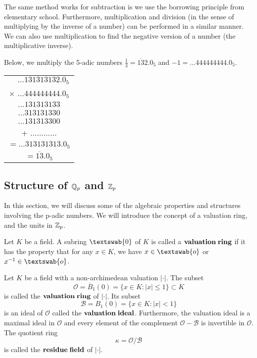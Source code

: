 \documentclass[a4paper]{article}
\begin{document}
The same method works for subtraction is we use the borrowing principle 
from elementary school.  Furthermore, multiplication and division (in
the sense of multiplying by the inverse of a number) can be performed 
in a similar manner.  We can also use multiplication to find the
negative version of a number (the multiplicative inverse).
\newpage
\begin{example}
Below, we multiply the 5-adic numbers $\frac{1}{3}=\overline{13}2.0_5$ 
and $-1=\dots444444444.0_5$.

\begin{center}
  \begin{tabular}{c}
    $\;\;\;\;$$\dots131313132.0_5$\\
    $\times$ $\dots444444444.0_5$\\
    \hline
    $\dots131313133$\\
    $\dots313131330$\\
    $\dots131313300$\\
    + $\dots\dots\dots\dots$\\
    \hline
    $=\dots313131313.0_5$\\
    $=\overline{13}.0_5$
  \end{tabular}
\end{center}
\end{example}

\subsection{Structure of $\mathbb Q_p$ and $\mathbb Z_p$}

In this section, we will discuss some of the algebraic properties and
structures involving the p-adic numbers.  We will introduce the concept 
of a valuation ring, and the units in $\mathbb Z_p$.

\begin{definition}
Let $K$ be a field.  A subring $\textswab{0}$ of $K$ is called a 
$\bf{valuation\;ring}$ if it has the property that for any $x\in K$, 
we have $x\in\textswab{o}$ or $x^{-1}\in\textswab{o}$.
\end{definition}

\begin{definition}
Let $K$ be a field with a non-archimedean valuation $|\cdot|$.  The subset
\[
	\mathcal{O}=\overline{B}_1(0)=\{x\in K:|x|\leq 1\}\subset K
\]
is called the $\bf{valuation\;ring}$ of $|\cdot|$.  Its subset
\[
	\mathcal{B}=B_1(0)=\{x\in K:|x|<1\}
\]
is an ideal of $\mathcal{O}$ called the $\bf{valuation\;ideal}$. 
Furthermore, the valuation ideal is a maximal ideal in $\mathcal{O}$ and
every element of the complement $\mathcal{O}-\mathcal{B}$ is invertible 
in $\mathcal{O}$.  The quotient ring
\[
	\kappa=\mathcal{O}/\mathcal{B}
\]
is called the $\bf{residue\;field}$ of $|\cdot|$.
\end{definition}
\end{document}
